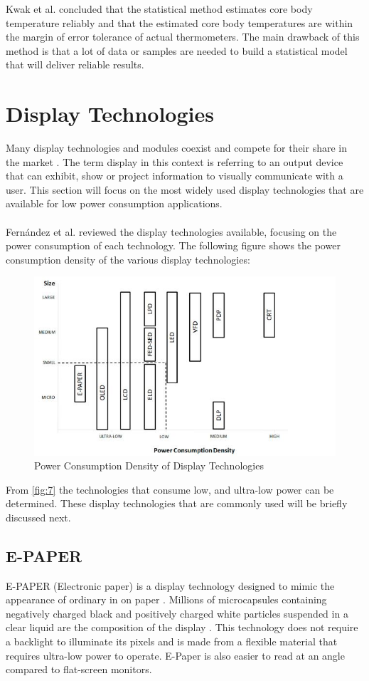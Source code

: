 \noindent
Kwak et al. \cite{Kwak2019} concluded that the statistical method estimates core body temperature reliably and that the estimated core body temperatures are within the margin of error tolerance of actual thermometers. The main drawback of this method is that a lot of data or samples are needed to build a statistical model that will deliver reliable results. 


\section{Display Technologies} 
Many display technologies and modules coexist and compete for their share in the market \cite{Fer2015}. The term display in this context is referring to an output device that can exhibit, show or project information to visually communicate with a user. This section will focus on the most widely used display technologies that are available for low power consumption applications.
\\
\\ 
Fernández et al. \cite{Fer2015} reviewed the display technologies available, focusing on the power consumption of each technology. The following figure shows the power consumption density of the various display technologies:
\begin{figure}[H]
	\centering
	\includegraphics[scale=0.9]{img/Display-power}
	\caption{Power Consumption Density of Display Technologies \cite{Fer2015}}
	\label{fig:7}
\end{figure}
\noindent
From \autoref{fig:7} the technologies that consume low, and ultra-low power can be determined. These display technologies that are commonly used will be briefly discussed next. 

\subsection{E-PAPER}
E-PAPER (Electronic paper)  is a display technology designed to mimic the appearance of ordinary in on paper \cite{Joseph2016}. Millions of microcapsules containing negatively charged black and positively charged white particles suspended in a clear liquid are the composition of the display \cite{Fer2015}. This technology does not require a backlight to illuminate its pixels and is made from a flexible material that requires ultra-low power to operate. E-Paper is also easier to read at an angle compared to flat-screen monitors.


